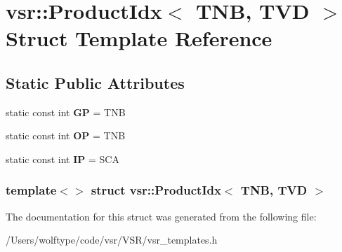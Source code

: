 \hypertarget{structvsr_1_1_product_idx_3_01_t_n_b_00_01_t_v_d_01_4}{\section{vsr\-:\-:Product\-Idx$<$ T\-N\-B, T\-V\-D $>$ Struct Template Reference}
\label{structvsr_1_1_product_idx_3_01_t_n_b_00_01_t_v_d_01_4}
}
\subsection*{Static Public Attributes}
\begin{DoxyCompactItemize}
\item 
\hypertarget{structvsr_1_1_product_idx_3_01_t_n_b_00_01_t_v_d_01_4_a0cb07b231577755dc791b24f1d339efc}{static const int {\bfseries G\-P} = T\-N\-B}\label{structvsr_1_1_product_idx_3_01_t_n_b_00_01_t_v_d_01_4_a0cb07b231577755dc791b24f1d339efc}

\item 
\hypertarget{structvsr_1_1_product_idx_3_01_t_n_b_00_01_t_v_d_01_4_a1d1d1e0f250e51acbe97d1eb35ccb868}{static const int {\bfseries O\-P} = T\-N\-B}\label{structvsr_1_1_product_idx_3_01_t_n_b_00_01_t_v_d_01_4_a1d1d1e0f250e51acbe97d1eb35ccb868}

\item 
\hypertarget{structvsr_1_1_product_idx_3_01_t_n_b_00_01_t_v_d_01_4_ac92262d1927aad6cef51466ed9544be7}{static const int {\bfseries I\-P} = S\-C\-A}\label{structvsr_1_1_product_idx_3_01_t_n_b_00_01_t_v_d_01_4_ac92262d1927aad6cef51466ed9544be7}

\end{DoxyCompactItemize}
\subsubsection*{template$<$$>$ struct vsr\-::\-Product\-Idx$<$ T\-N\-B, T\-V\-D $>$}



The documentation for this struct was generated from the following file\-:\begin{DoxyCompactItemize}
\item 
/\-Users/wolftype/code/vsr/\-V\-S\-R/vsr\-\_\-templates.\-h\end{DoxyCompactItemize}
